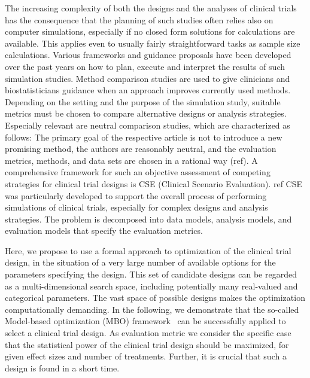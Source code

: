\documentclass[bimj,fleqn]{w-art}
\theoremstyle{plain}
\theoremstyle{definition}
\begin{document}
The increasing complexity of both the designs and the analyses of clinical trials has the consequence that the planning of such studies often relies also on computer simulations, especially if no closed form solutions for calculations are available.
This applies even to usually fairly straightforward tasks as sample size calculations. 
Various frameworks and guidance proposals have been developed over the past years on how to plan, execute and interpret the results of such simulation studies.
Method comparison studies are used to give clinicians and biostatisticians guidance when an approach improves currently used methods.  
Depending on the setting and the purpose of the simulation study, suitable metrics must be chosen to compare alternative designs or analysis strategies. 
Especially relevant are neutral comparison studies, which are characterized as follows: %
The primary goal of the respective article is not to introduce a new promising method, the authors are reasonably neutral, and the evaluation metrics, methods, and data sets are chosen in a rational way (ref).
A comprehensive framework for such an objective assessment of competing strategies for clinical trial designs is CSE (Clinical Scenario Evaluation). ref %
CSE was particularly developed to support the overall process of performing simulations of clinical trials, especially for complex designs and analysis strategies.
The problem is decomposed into data models, analysis models, and evaluation models that specify the evaluation metrics.

Here, we propose to use a formal approach to optimization of the clinical trial design, in the situation of a very large number of available options for the parameters specifying the design. 
This set of candidate designs can be regarded as a multi-dimensional search space, including potentially many real-valued and categorical parameters.
The vast space of possible designs makes the optimization computationally demanding.
In the following, we demonstrate that the so-called Model-based optimization (MBO) framework~\citep{jones_taxonomy_2001} can be successfully applied to select a clinical trial design.
As evaluation metric we consider the specific case that the statistical power of the clinical trial design should be maximized, for given effect sizes and number of treatments.
Further, it is crucial that such a design is found in a short time.
\end{document}
